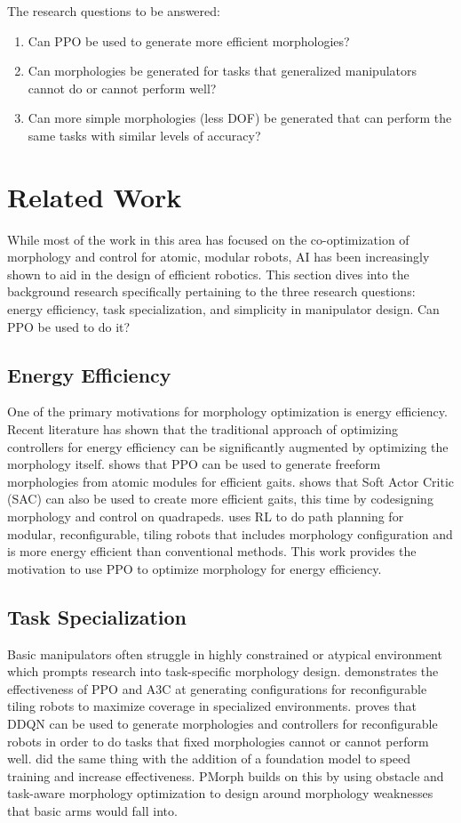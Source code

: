 \documentclass[defaultstyle,11pt]{thesis}
\begin{document}
The research questions to be answered: 
\begin{enumerate}
    \item Can PPO be used to generate more efficient morphologies?
    \item Can morphologies be generated for tasks that generalized manipulators cannot do or cannot perform well?
    \item Can more simple morphologies (less DOF) be generated that can perform the same tasks with similar levels of accuracy?
\end{enumerate}

\chapter{Related Work}

While most of the work in this area has focused on the co-optimization of morphology and control for atomic, modular robots, AI has been increasingly shown to aid in the design of efficient robotics.
This section dives into the background research specifically pertaining to the three research questions: energy efficiency, task specialization, and simplicity in manipulator design.
Can PPO be used to do it?

\section{Energy Efficiency}
One of the primary motivations for morphology optimization is energy efficiency.
Recent literature has shown that the traditional approach of optimizing controllers for energy efficiency can be significantly augmented by optimizing the morphology itself.
\cite{bhatia2023reinforcement} shows that PPO can be used to generate freeform morphologies from atomic modules for efficient gaits.
\cite{luck2019data} shows that Soft Actor Critic (SAC) can also be used to create more efficient gaits, this time by codesigning morphology and control on quadrapeds.
\cite{le2020reinforcement} uses RL to do path planning for modular, reconfigurable, tiling robots that includes morphology configuration and is more energy efficient than conventional methods.
This work provides the motivation to use PPO to optimize morphology for energy efficiency.

\section{Task Specialization}
Basic manipulators often struggle in highly constrained or atypical environment which prompts research into task-specific morphology design.
\cite{kalimuthu2023} demonstrates the effectiveness of PPO and A3C at generating configurations for reconfigurable tiling robots to maximize coverage in specialized environments.
\cite{ding2024modular} proves that DDQN can be used to generate morphologies and controllers for reconfigurable robots in order to do tasks that fixed morphologies cannot or cannot perform well.
\cite{spielberg2025accelerated} did the same thing with the addition of a foundation model to speed training and increase effectiveness.
PMorph builds on this by using obstacle and task-aware morphology optimization to design around morphology weaknesses that basic arms would fall into.
\end{document}
